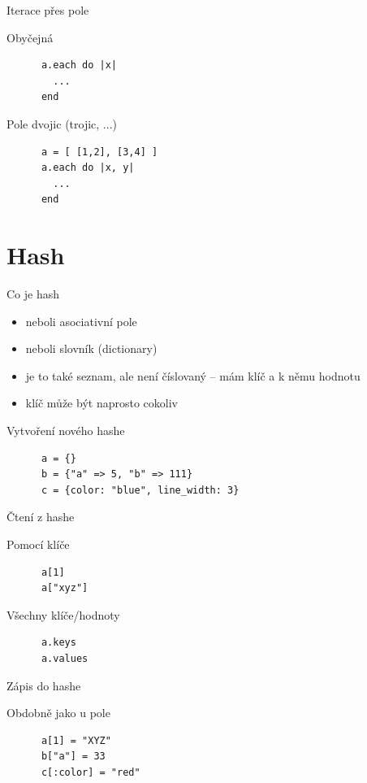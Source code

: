 \documentclass{beamer}
\begin{document}
\begin{frame}[fragile]{Iterace přes pole}
  \begin{block}{Obyčejná}
    \begin{verbatim}
      a.each do |x|
        ...
      end
    \end{verbatim}
  \end{block}
  \begin{block}{Pole dvojic (trojic, ...)}
    \begin{verbatim}
      a = [ [1,2], [3,4] ]
      a.each do |x, y|
        ...
      end
    \end{verbatim}
  \end{block}
\end{frame}

\section{Hash}

\begin{frame}{Co je hash}
  \begin{itemize}
    \item neboli asociativní pole
    \item neboli slovník (dictionary)
    \item je to také seznam, ale není číslovaný – mám klíč a k němu hodnotu
    \item klíč může být naprosto cokoliv
  \end{itemize}
\end{frame}

\begin{frame}[fragile]{Vytvoření nového hashe}
  \begin{block}{}
    \begin{verbatim}
      a = {}
      b = {"a" => 5, "b" => 111}
      c = {color: "blue", line_width: 3}
    \end{verbatim}
  \end{block}
\end{frame}

\begin{frame}[fragile]{Čtení z hashe}
  \begin{block}{Pomocí klíče}
    \begin{verbatim}
      a[1]
      a["xyz"]
    \end{verbatim}
  \end{block}
  \begin{block}{Všechny klíče/hodnoty}
    \begin{verbatim}
      a.keys
      a.values
    \end{verbatim}
  \end{block}
\end{frame}
%
\begin{frame}[fragile]{Zápis do hashe}
  \begin{block}{Obdobně jako u pole}
    \begin{verbatim}
      a[1] = "XYZ"
      b["a"] = 33
      c[:color] = "red"
    \end{verbatim}
  \end{block}
\end{frame}
\end{document}
